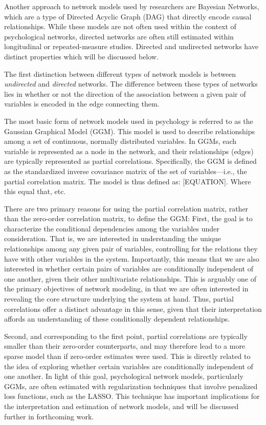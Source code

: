 Another approach to network models used by researchers are Bayesian Networks, which are a type of Directed Acyclic Graph (DAG) that directly encode causal relationships. While these models are not often used within the context of psychological networks, directed networks are often still estimated within longitudinal or repeated-measure studies. Directed and undirected networks have distinct properties which will be discussed below. 

The first distinction between different types of network models is between \textit{undirected} and \textit{directed} networks. The difference between these types of networks lies in whether or not the direction of the association between a given pair of variables is encoded in the edge connecting them.

The most basic form of network models used in psychology is referred to as the Gaussian Graphical Model (GGM). This model is used to describe relationships among a set of continuous, normally distributed variables. In GGMs, each variable is represented as a node in the network, and their relationships (edges) are typically represented as partial correlations. Specifically, the GGM is defined as the standardized inverse covariance matrix of the set of variables—i.e., the partial correlation matrix. The model is thus defined as: [EQUATION]. Where this equal that, etc.

There are two primary reasons for using the partial correlation matrix, rather than the zero-order correlation matrix, to define the GGM: First, the goal is to characterize the conditional dependencies among the variables under consideration. That is, we are interested in understanding the unique relationships among any given pair of variables, controlling for the relations they have with other variables in the system. Importantly, this means that we are also interested in whether certain pairs of variables are conditionally independent of one another, given their other multivariate relationships. This is arguably one of the primary objectives of network modeling, in that we are often interested in revealing the core structure underlying the system at hand. Thus, partial correlations offer a distinct advantage in this sense, given that their interpretation affords an understanding of these conditionally dependent relationships. 

Second, and corresponding to the first point, partial correlations are typically smaller than their zero-order counterparts, and may therefore lead to a more sparse model than if zero-order estimates were used. This is directly related to the idea of exploring whether certain variables are conditionally independent of one another. In light of this goal, psychological network models, particularly GGMs, are often estimated with regularization techniques that involve penalized loss functions, such as the LASSO. This technique has important implications for the interpretation and estimation of network models, and will be discussed further in forthcoming work.

